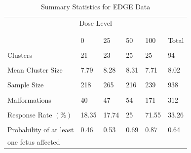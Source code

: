 \documentclass[12pt,oneside]{report}
\theoremstyle{definition}
\theoremstyle{mystyle}
\begin{document}
\begin{table}[h!]
	\caption{Summary Statistics for EDGE Data}
	\begin{center}
		
		\begin{tabular}{llllll}
			\hline\hline
			
			\multicolumn{6}{c}{Dose Level} \\
			&&&&&\\
			\cline{2-5}\cline{2-6}
			&&&&&\\
			& 0 & 25&50&100 &Total\\
			&&&&&\\
			\hline
			Clusters &21   & 23 &25 & 25&94\\
			&&&&&\\
			Mean Cluster Size& 7.79 & 8.28& 8.31 & 7.71&8.02\\
			&&&&&\\
			Sample Size & 218& 265 & 216 &239 &938\\
			&&&&&\\
			Malformations & 40 & 47 & 54 & 171 &312\\
			&&&&&\\
			Response Rate $(\%)$ & 18.35 & 17.74 & 25 &71.55  &33.26\\
			&&&&&\\
			Probability of  at least& 0.46 & 0.53 & 0.69 & 0.87 & 0.64\\
			one fetus affected&&&&&\\
			\hline
		\end{tabular}
		\label{table:summary}
	\end{center}
\end{table}	
\end{document}
